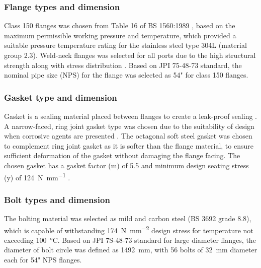 

\subsubsection{Flange types and dimension}
Class 150 flanges was chosen from Table 16 of BS 1560:1989 \cite{noauthor_circular_nodate}, based on the maximum permissible working pressure and temperature, which provided a suitable pressure temperature rating for the stainless steel type 304L (material group 2.3). Weld-neck flanges was selected for all ports due to the high structural strength along with stress distribution \cite{ulma_forge_welding_2020}.
Based on JPI 75-48-73 standard, the nominal pipe size (NPS) for the flange was selected as 54" for class 150 flanges.

\subsubsection{Gasket type and dimension}
Gasket is a sealing material placed between flanges to create a leak-proof sealing \cite{varun_piping_nodate}. A narrow-faced, ring joint gasket type was chosen due to the suitability of design when corrosive agents are presented \cite{noauthor_ring_nodate}. The octagonal soft steel gasket was chosen to complement ring joint gasket as it is softer than the flange material, to ensure sufficient deformation of the gasket without damaging the flange facing. The chosen gasket has a gasket factor (m) of 5.5 and minimum design seating stress (y) of \SI{124}{\N\per\mm} \cite{noauthor_unfired_nodate}.

\subsubsection{Bolt types and dimension}
The bolting material was selected as mild and carbon steel (BS 3692 grade 8.8), which is capable of withstanding \SI{174}{\N\per\square\mm} design stress for temperature not exceeding \SI{100}{\celsius}. Based on JPI 7S-48-73 standard for large diameter flanges, the diameter of bolt circle was defined as \SI{1492}{\milli \metre}, with 56 bolts of \SI{32}{\milli \metre} diameter each for 54" NPS flanges. 

